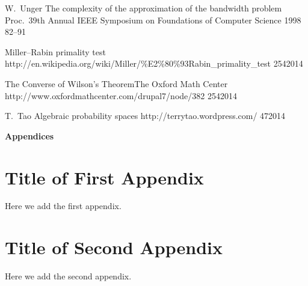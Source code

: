 \documentclass[12pt,a4paper,titlepage,openany]{report}
\begin{document}
\begin{thebibliography}{99}
\conferenceArticleOneAuthor
    {W.~Unger}
    {The complexity of the approximation of the bandwidth problem}
    {Proc.~39th Annual IEEE Symposium on Foundations of Computer Science}
    {1998}
    {82--91}

\webPageNoAuthor
    {Miller--Rabin primality test}
    {\newline http://en.wikipedia.org/wiki/Miller/\%E2\%80\%93Rabin\_primality\_test}
    {25}{4}{2014}

\webPageNoAuthorWithInstitution
    {The Converse of Wilson's Theorem}{The Oxford Math Center}
    {http://www.oxfordmathcenter.com/drupal7/node/382}
    {25}{4}{2014}

\webPageOneAuthor
    {T.~Tao}
    {Algebraic probability spaces}
    {http://terrytao.wordpress.com/}
    {4}{7}{2014}

\end{thebibliography}
\newpage


\pagestyle{fancyplain}
\vspace*{\fill}
     \begin{center}
          \bf{\Huge{Appendices}}
     \end{center}
\vspace*{\fill}
\thispagestyle{fancy}

\appendix
\thispagestyle{empty}

\chapter{Title of First Appendix}
\thispagestyle{empty}
Here we add the first appendix.


\chapter{Title of Second Appendix}
\thispagestyle{empty}
Here we add the second appendix.


\end{document}
